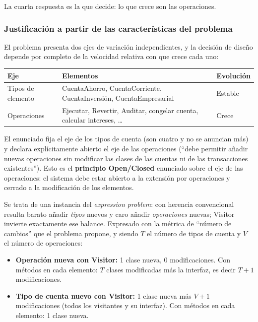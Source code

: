 La cuarta respuesta es la que decide: lo que crece son las operaciones.

\subsubsection*{Justificación a partir de las características del problema}

El problema presenta dos ejes de variación independientes, y la decisión de diseño depende por
completo de la velocidad relativa con que crece cada uno:

\begin{table}[h!]
    \centering
    \begin{tabular}{lp{6.6cm}l}
        \toprule
        \textbf{Eje} & \textbf{Elementos} & \textbf{Evolución} \\
        \midrule
        Tipos de elemento & CuentaAhorro, CuentaCorriente, CuentaInversión, CuentaEmpresarial
                          & Estable \\
        Operaciones       & Ejecutar, Revertir, Auditar, congelar cuenta, calcular intereses, \ldots
                          & Crece \\
        \bottomrule
    \end{tabular}
\end{table}

El enunciado fija el eje de los tipos de cuenta (son cuatro y no se anuncian más) y declara
explícitamente abierto el eje de las operaciones (``debe permitir añadir nuevas operaciones
sin modificar las clases de las cuentas ni de las transacciones existentes''). Esto es el
\textbf{principio Open/Closed} enunciado sobre el eje de las operaciones: el sistema debe estar
abierto a la extensión por operaciones y cerrado a la modificación de los elementos.

Se trata de una instancia del \textit{expression problem}: con herencia convencional resulta
barato añadir \emph{tipos} nuevos y caro añadir \emph{operaciones} nuevas; Visitor invierte
exactamente ese balance. Expresado con la métrica de ``número de cambios'' que el problema
propone, y siendo $T$ el número de tipos de cuenta y $V$ el número de operaciones:

\begin{itemize}[leftmargin=1.2cm]
    \item \textbf{Operación nueva con Visitor:} 1 clase nueva, 0 modificaciones.
          Con métodos en cada elemento: $T$ clases modificadas más la interfaz, es decir
          $T+1$ modificaciones.
    \item \textbf{Tipo de cuenta nuevo con Visitor:} 1 clase nueva más $V+1$ modificaciones
          (todos los visitantes y su interfaz). Con métodos en cada elemento: 1 clase nueva.
\end{itemize}

